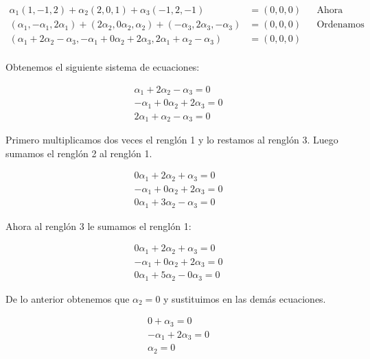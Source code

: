 \documentclass[letterpaper]{article}
\renewcommand{\*}{\cdot}
\theoremstyle{definition}
\begin{document}
\begin{align*}
	\alpha_{1}(1,-1,2)+\alpha_{2}(2,0,1)+ \alpha_{3}(-1,2,-1)&=(0,0,0) && \text{Ahora}\\
	(\alpha_{1},-\alpha_{1},2\alpha_{1})+(2\alpha_{2},0\alpha_{2},\alpha_{2})+ (-\alpha_{3},2\alpha_{3},-\alpha_{3})&=(0,0,0) && \text{Ordenamos los escalares}\\
	(\alpha_{1}+2\alpha_{2}-\alpha_{3}, -\alpha_{1}+0\alpha_{2}+2\alpha_{3}, 2\alpha_{1}+\alpha_{2}-\alpha_{3}) &= (0,0,0) &&\\
\end{align*}

Obtenemos el siguiente sistema de ecuaciones:
\begin{center}
	\begin{align*}
	\alpha_{1}+2\alpha_{2}-\alpha_{3}=0\\
	-\alpha_{1}+0\alpha_{2}+2\alpha_{3}=0\\
	2\alpha_{1}+\alpha_{2}-\alpha_{3}=0
	\end{align*}
\end{center}

Primero multiplicamos dos veces el renglón 1 y lo restamos al renglón 3. Luego sumamos el renglón 2 al renglón 1.
\begin{center}
	\begin{align*}
	0\alpha_{1}+2\alpha_{2}+\alpha_{3}=0\\
	-\alpha_{1}+0\alpha_{2}+2\alpha_{3}=0\\
	0\alpha_{1}+3\alpha_{2}-\alpha_{3}=0
	\end{align*}
\end{center}

Ahora al renglón 3 le sumamos el renglón 1:

\begin{center}
	\begin{align*}
	0\alpha_{1}+2\alpha_{2}+\alpha_{3}=0\\
	-\alpha_{1}+0\alpha_{2}+2\alpha_{3}=0\\
	0\alpha_{1}+5\alpha_{2}-0\alpha_{3}=0
	\end{align*}
\end{center}

De lo anterior obtenemos que $\alpha_{2}= 0$ y sustituimos en las demás ecuaciones.

\begin{center}
	\begin{align*}
	0+\alpha_{3}=0\\
	-\alpha_{1}+2\alpha_{3}=0\\
	\alpha_{2}=0
	\end{align*}
\end{center}
\end{document}

